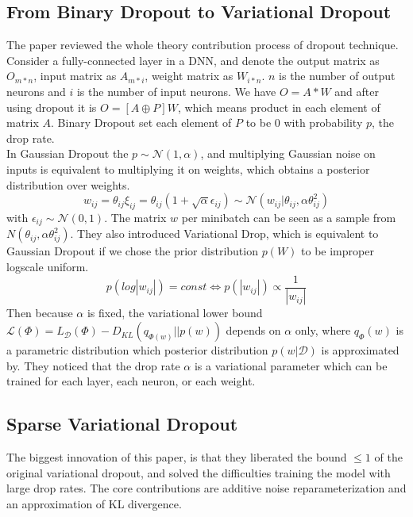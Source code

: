\documentclass{article}
\begin{document}
	\subsection{From Binary Dropout to Variational Dropout}
	The paper reviewed the whole theory contribution process of dropout technique. Consider a fully-connected layer in a DNN, and denote the output matrix as $O_{m*n}$, input matrix as $A_{m*i}$, weight matrix as $W_{i*n}$. $n$ is the number of output neurons and $i$ is the number of input neurons. We have $O=A*W$ and after using dropout it is $O=[A\oplus P]W$, which means product in each element of matrix $A$. Binary Dropout set each element of $P$ to be $0$ with probability $p$, the drop rate.\\
	In Gaussian Dropout the $p\sim \mathcal{N}(1,\alpha)$, and multiplying Gaussian noise on inputs is equivalent to multiplying it on weights, which obtains a posterior distribution over weights. 
	\begin{equation}
	w_{ij}=\theta_{ij}\xi_{ij}=\theta_{ij}(1+\sqrt{\alpha}\epsilon_{ij}) \sim \mathcal{N}(w_{ij}|\theta_{ij},\alpha\theta_{ij}^2) 
	\label{eq1}
	\end{equation}
	with $\epsilon_{ij}\sim \mathcal{N}(0,1)$. The matrix $w$ per minibatch can be seen as a sample from $N(\theta_{ij},\alpha\theta_{ij}^2)$.
	They also introduced Variational Drop, which is equivalent to Gaussian Dropout if we chose the prior distribution $p(W)$ to be improper logscale uniform.
	\begin{equation}
	p(log|w_{ij}|)=const \Leftrightarrow p(|w_{ij}|) \propto \frac{1}{|w_{ij}|}
	\label{eq2}
	\end{equation}
	Then because $\alpha$ is fixed, the variational lower bound $\mathcal{L}(\Phi) = L_{\mathcal{D}}(\Phi)-D_{KL}(q_{\Phi(w)}||p(w))$ depends on $\alpha$ only, where $q_{\Phi}(w)$ is a parametric distribution which posterior distribution ${p(w|\mathcal{D})}$ is approximated by. They noticed that the drop rate $\alpha$ is a variational parameter which can be trained for each layer, each neuron, or each weight.\\

	\subsection{Sparse Variational Dropout}
	The biggest innovation of this paper, is that they liberated the bound $\leq 1$ of the original variational dropout, and solved the difficulties training the model with large drop rates. The core contributions are additive noise reparameterization and an approximation of KL divergence.\\
\end{document}
